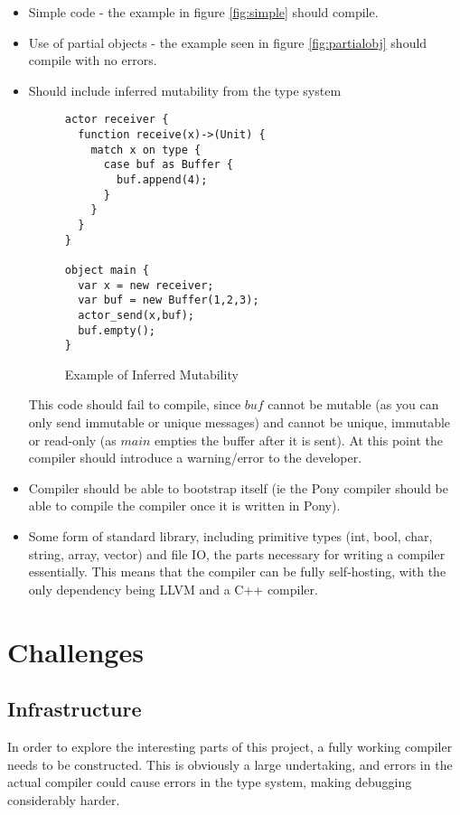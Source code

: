 \documentclass{article}
\begin{document}
\begin{itemize}

\item Simple code - the example in figure \ref{fig:simple} should compile.
\item Use of partial objects - the example seen in figure \ref{fig:partialobj} should compile
with no errors.

\item Should include inferred mutability from the type system

\begin{figure}
\begin{verbatim}
actor receiver {
  function receive(x)->(Unit) {
    match x on type {
      case buf as Buffer {
        buf.append(4);
      }
    }
  }
}

object main {
  var x = new receiver;
  var buf = new Buffer(1,2,3);
  actor_send(x,buf);
  buf.empty();
}
\end{verbatim}
\caption{Example of Inferred Mutability}
\end{figure}

This code should fail to compile, since $buf$ cannot be mutable (as you can only
send immutable or unique messages) and cannot be unique, immutable or read-only
(as $main$ empties the buffer after it is sent). At this point the compiler should
introduce a warning/error to the developer.

\item Compiler should be able to bootstrap itself (ie the Pony compiler should be able
to compile the compiler once it is written in Pony).

\item Some form of standard library, including primitive types (int, bool,
char, string, array, vector) and file IO, the parts necessary for writing a
compiler essentially. This means that the compiler can be fully self-hosting,
with the only dependency being LLVM and a C++ compiler.
\end{itemize}

\section{Challenges}

\subsection{Infrastructure}

In order to explore the interesting parts of this project, a fully working
compiler needs to be constructed. This is obviously a large undertaking, and
errors in the actual compiler could cause errors in the type system, making
debugging considerably harder.
\end{document}
